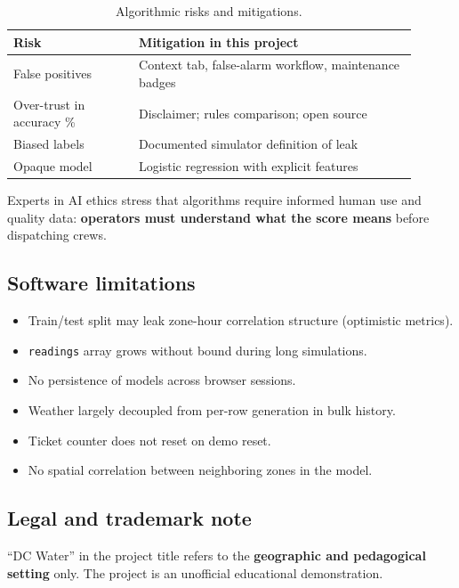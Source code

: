 \documentclass[12pt,a4paper]{article}
\begin{document}
\begin{table}[htbp]
\centering
\caption{Algorithmic risks and mitigations.}
\label{tab:risks}
\begin{tabular}{@{}p{0.28\linewidth}p{0.62\linewidth}@{}}
\toprule
\textbf{Risk} & \textbf{Mitigation in this project} \\
\midrule
False positives & Context tab, false-alarm workflow, maintenance badges \\
Over-trust in accuracy \% & Disclaimer; rules comparison; open source \\
Biased labels & Documented simulator definition of leak \\
Opaque model & Logistic regression with explicit features \\
\bottomrule
\end{tabular}
\end{table}

Experts in AI ethics stress that algorithms require informed human use and quality data: \textbf{operators must understand what the score means} before dispatching crews.

\subsection{Software limitations}

\begin{itemize}
    \item Train/test split may leak zone-hour correlation structure (optimistic metrics).
    \item \texttt{readings} array grows without bound during long simulations.
    \item No persistence of models across browser sessions.
    \item Weather largely decoupled from per-row generation in bulk history.
    \item Ticket counter does not reset on demo reset.
    \item No spatial correlation between neighboring zones in the model.
\end{itemize}

\subsection{Legal and trademark note}

``DC Water'' in the project title refers to the \textbf{geographic and pedagogical setting} only. The project is an unofficial educational demonstration.
\end{document}

